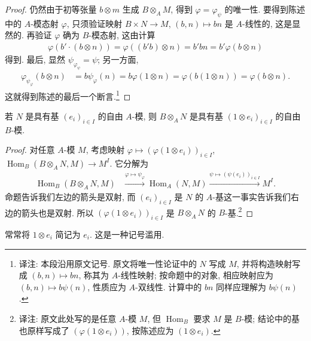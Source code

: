 \begin{proof}
仍然由于初等张量 $b\otimes m$ 生成 $B\otimes_A M$, 得到 $\varphi=\varphi_\psi$ 的唯一性. 要得到陈述中的 $A$-模态射 $\varphi$, 只须验证映射 $B\times N\longrightarrow M$, $(b,n)\mapsto bn$ 是 $A$-线性的, 这是显然的. 再验证 $\varphi$ 确为 $B$-模态射, 这由计算
\begin{align*}
\varphi(b'\cdot(b\otimes n))=\varphi((b'b)\otimes n)=b'bn=b'\varphi(b\otimes n)
\end{align*}
得到. 最后, 显然 $\psi_{\varphi_\psi}=\psi$; 另一方面,
\begin{align*}
\varphi_{\psi_\varphi}(b\otimes n)&=b\psi_\varphi(n)=b\varphi(1\otimes n)
=\varphi(b(1\otimes n))=\varphi(b\otimes n).
\end{align*}
这就得到陈述的最后一个断言.\footnote{译注: 本段沿用原文记号. 原文将唯一性论证中的 $N$ 写成 $M$, 并将构造映射写成 $(b,n)\mapsto bn$, 称其为 $A$-线性映射; 按命题中的对象, 相应映射应为 $(b,n)\mapsto b\psi(n)$, 性质应为 $A$-双线性. 计算中的 $bn$ 同样应理解为 $b\psi(n)$.}
\end{proof}
\begin{corollary*}
若 $N$ 是具有基 $(e_i)_{i\in I}$ 的自由 $A$-模, 则 $B\otimes_A N$ 是具有基 $(1\otimes e_i)_{i\in I}$ 的自由 $B$-模.
\end{corollary*}
\begin{proof}
对任意 $A$-模 $M$, 考虑映射 $\varphi\mapsto(\varphi(1\otimes e_i))_{i\in I}$, $\operatorname{Hom}_B(B\otimes_A N,M)\longrightarrow M^I$. 它分解为
\begin{align*}
\operatorname{Hom}_B(B\otimes_A N,M)
&\xrightarrow{\varphi\mapsto\psi_\varphi}\operatorname{Hom}_A(N,M)
\xrightarrow{\psi\mapsto(\psi(e_i))_{i\in I}}M^I.
\end{align*}
命题告诉我们左边的箭头是双射, 而 $(e_i)_{i\in I}$ 是 $N$ 的 $A$-基这一事实告诉我们右边的箭头也是双射. 所以 $(\varphi(1\otimes e_i))_{i\in I}$ 是 $B\otimes_A N$ 的 $B$-基.\footnote{译注: 原文此处写的是任意 $A$-模 $M$, 但 $\operatorname{Hom}_B$ 要求 $M$ 是 $B$-模; 结论中的基也原样写成了 $(\varphi(1\otimes e_i))$, 按陈述应为 $(1\otimes e_i)$.}
\end{proof}
\begin{remark*}
常常将 $1\otimes e_i$ 简记为 $e_i$. 这是一种记号滥用.
\end{remark*}
